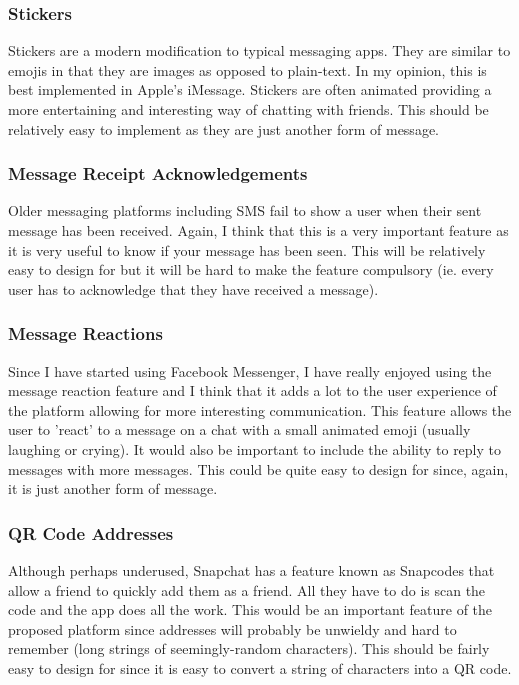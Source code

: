 \documentclass{article}
\begin{document}
\subsubsection{Stickers}
Stickers are a modern modification to typical messaging apps. They are similar to emojis in that they are images as opposed to plain-text. In my opinion, this is best implemented in Apple's iMessage. Stickers are often animated providing a more entertaining and interesting way of chatting with friends. This should be relatively easy to implement as they are just another form of message.

\subsubsection{Message Receipt Acknowledgements}
Older messaging platforms including SMS fail to show a user when their sent message has been received. Again, I think that this is a very important feature as it is very useful to know if your message has been seen. This will be relatively easy to design for but it will be hard to make the feature compulsory (ie. every user has to acknowledge that they have received a message).

\subsubsection{Message Reactions}
Since I have started using Facebook Messenger, I have really enjoyed using the message reaction feature and I think that it adds a lot to the user experience of the platform allowing for more interesting communication. This feature allows the user to 'react' to a message on a chat with a small animated emoji (usually laughing or crying). It would also be important to include the ability to reply to messages with more messages. This could be quite easy to design for since, again, it is just another form of message.

\subsubsection{QR Code Addresses}\label{subsubsec:qrcodes}
Although perhaps underused, Snapchat has a feature known as Snapcodes that allow a friend to quickly add them as a friend. All they have to do is scan the code and the app does all the work. This would be an important feature of the proposed platform since addresses will probably be unwieldy and hard to remember (long strings of seemingly-random characters). This should be fairly easy to design for since it is easy to convert a string of characters into a QR code.
\end{document}
